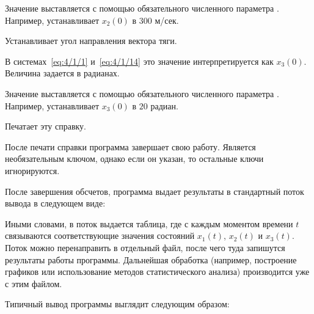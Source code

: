 \begin{description}
		Значение выставляется с помощью обязательного численного параметра . Например,  устанавливает $x_2(0)$ в $300$ м/сек.
		
	\item[\code{-x3~num}]
		Устанавливает угол направления вектора тяги.
		
		В системах~\ref{eq:4/1/1} и~\ref{eq:4/1/14} это значение интерпретируется как $x_3(0)$. Величина задается в радианах.
		
		Значение выставляется с помощью обязательного численного параметра . Например,  устанавливает $x_3(0)$ в $20$ радиан.
		
	\item[\code{--help}]
		Печатает эту справку.
		
		После печати справки программа завершает свою работу. Является необязательным ключом, однако если он указан, то остальные ключи игнорируются.
\end{description}

После завершения обсчетов, программа выдает результаты в стандартный поток вывода в следующем виде:


Иными словами, в поток выдается таблица, где с каждым моментом времени $t$ связываются соответствующие значения состояний $x_1(t)$, $x_2(t)$ и $x_3(t)$. Поток можно перенаправить в отдельный файл, после чего туда запишутся результаты работы программы. Дальнейшая обработка (например, построение графиков или использование методов статистического анализа) производится уже с этим файлом.

Типичный вывод программы выглядит следующим образом:


